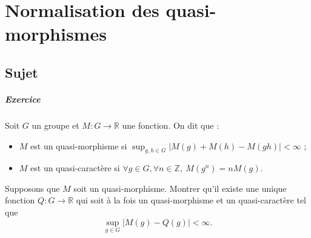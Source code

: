 \chapter{Normalisation des quasi-morphismes}

\section{Sujet}

\paragraph{Exercice}
Soit $G$ un groupe et $M : G \to \mathbb R$ une fonction. On dit que :
\begin{itemize}
    \item $M$ est un quasi-morphisme si $\sup_{g,h \in G} |M(g) + M(h) - M(gh)| < \infty$ ;
    \item $M$ est un quasi-caractère si $\forall g \in G,\forall n\in \mathbb Z,\ M(g^n) = nM(g).$
\end{itemize}
Supposons que $M$ soit un quasi-morphisme. Montrer qu'il existe une unique fonction $Q : G \to \mathbb R$ qui soit à la fois un quasi-morphisme et un quasi-caractère tel que
\[
\sup_{g\in G} |M(g) - Q(g)| < \infty.
\]

